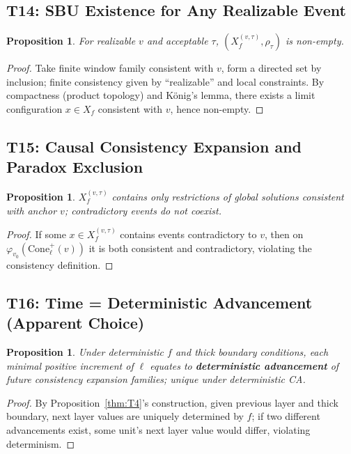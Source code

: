 \documentclass[11pt]{article}
\newtheorem{proposition}[theorem]{Proposition}
\theoremstyle{definition}
\theoremstyle{remark}
\begin{document}
\subsection{T14: SBU Existence for Any Realizable Event}

\begin{proposition}\label{thm:T14}
For realizable \( v \) and acceptable \( \tau \), \( (X_f^{(v,\tau)}, \rho_\tau) \) is non-empty.
\end{proposition}

\begin{proof}
Take finite window family consistent with \( v \), form a directed set by inclusion; finite consistency given by ``realizable'' and local constraints. By compactness (product topology) and König's lemma, there exists a limit configuration \( x \in X_f \) consistent with \( v \), hence non-empty.
\end{proof}

\subsection{T15: Causal Consistency Expansion and Paradox Exclusion}

\begin{proposition}\label{thm:T15}
\( X_f^{(v,\tau)} \) contains only restrictions of global solutions consistent with anchor \( v \); contradictory events do not coexist.
\end{proposition}

\begin{proof}
If some \( x \in X_f^{(v,\tau)} \) contains events contradictory to \( v \), then on \( \varphi_{v_0}(\mathrm{Cone}_\ell^+(v)) \) it is both consistent and contradictory, violating the consistency definition.
\end{proof}

\subsection{T16: Time = Deterministic Advancement (Apparent Choice)}

\begin{proposition}\label{thm:T16}
Under deterministic \( f \) and thick boundary conditions, each minimal positive increment of \( \ell \) equates to \textbf{deterministic advancement} of future consistency expansion families; unique under deterministic CA.
\end{proposition}

\begin{proof}
By Proposition~\ref{thm:T4}'s construction, given previous layer and thick boundary, next layer values are uniquely determined by \( f \); if two different advancements exist, some unit's next layer value would differ, violating determinism.
\end{proof}
\end{document}
